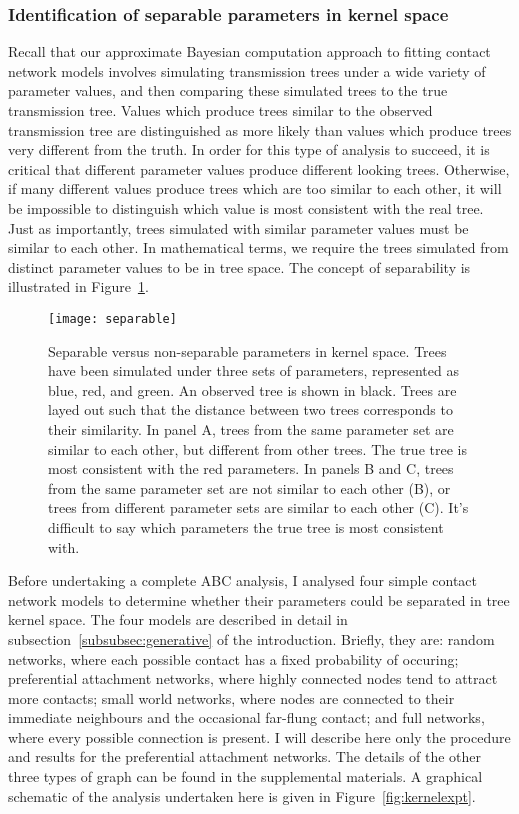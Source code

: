 \subsubsection{Identification of separable parameters in kernel space}
\label{subsubsec:kernel}

Recall that our approximate Bayesian computation approach to fitting contact
network models involves simulating transmission trees under a wide variety of
parameter values, and then comparing these simulated trees to the true
transmission tree. Values which produce trees similar to the observed
transmission tree are distinguished as more likely than values which produce
trees very different from the truth. In order for this type of analysis to
succeed, it is critical that different parameter values produce different
looking trees. Otherwise, if many different values produce trees which are too
similar to each other, it will be impossible to distinguish which value is most
consistent with the real tree. Just as importantly, trees simulated with
similar parameter values must be similar to each other. In mathematical terms,
we require the trees simulated from distinct parameter values to be
 in tree space. The concept of separability is illustrated in
Figure~\ref{fig:separable}.

\begin{figure}[ht]
  \centering
  \texttt{[image: separable]}
  \caption[Separable versus non-separable pararameters in kernel space]{
    Separable versus non-separable parameters in kernel space. Trees have been
    simulated under three sets of parameters, represented as blue, red, and
    green. An observed tree is shown in black. Trees are layed out such that
    the distance between two trees corresponds to their similarity. In panel A,
    trees from the same parameter set are similar to each other, but different
    from other trees. The true tree is most consistent with the red parameters.
    In panels B and C, trees from the same parameter set are not similar to
    each other (B), or trees from different parameter sets are similar to each
    other (C). It's difficult to say which parameters the true tree is most
    consistent with.
  }
  \label{fig:separable}
\end{figure}

Before undertaking a complete ABC analysis, I analysed four simple contact
network models to determine whether their parameters could be separated in tree
kernel space. The four models are described in detail in
subsection~\ref{subsubsec:generative} of the introduction. Briefly, they are:
random networks, where each possible contact has a fixed probability of
occuring; preferential attachment networks, where highly connected nodes tend
to attract more contacts; small world networks, where nodes are connected to
their immediate neighbours and the occasional far-flung contact; and full
networks, where every possible connection is present. I will describe here only
the procedure and results for the preferential attachment networks. The details
of the other three types of graph can be found in the supplemental materials. A
graphical schematic of the analysis undertaken here is given in
Figure~\ref{fig:kernelexpt}.

